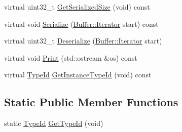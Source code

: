 \begin{DoxyCompactItemize}
\item 
virtual uint32\+\_\+t \hyperlink{classns3_1_1UanHeaderRcCts_ac95e8ccbcfdf49baca91322121218995}{Get\+Serialized\+Size} (void) const 
\item 
virtual void \hyperlink{classns3_1_1UanHeaderRcCts_ab02231957c4e1e798cd7d9b383af8b0e}{Serialize} (\hyperlink{classns3_1_1Buffer_1_1Iterator}{Buffer\+::\+Iterator} start) const 
\item 
virtual uint32\+\_\+t \hyperlink{classns3_1_1UanHeaderRcCts_a6fca1e983c47dbd387adacc9d59771d9}{Deserialize} (\hyperlink{classns3_1_1Buffer_1_1Iterator}{Buffer\+::\+Iterator} start)
\item 
virtual void \hyperlink{classns3_1_1UanHeaderRcCts_ab90d897529e88057fb7f0a6ca18e9cb3}{Print} (std\+::ostream \&os) const 
\item 
virtual \hyperlink{classns3_1_1TypeId}{Type\+Id} \hyperlink{classns3_1_1UanHeaderRcCts_a8b8ba3ce40b43ece95595278e690a10c}{Get\+Instance\+Type\+Id} (void) const 
\end{DoxyCompactItemize}
\subsection*{Static Public Member Functions}
\begin{DoxyCompactItemize}
\item 
static \hyperlink{classns3_1_1TypeId}{Type\+Id} \hyperlink{classns3_1_1UanHeaderRcCts_ace77f33ff78cb01a98c61254e770db91}{Get\+Type\+Id} (void)
\end{DoxyCompactItemize}
